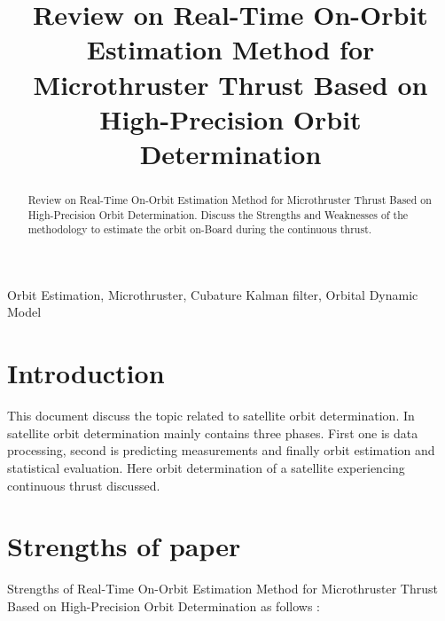 \documentclass[conference]{IEEEtran}
\begin{document}
\title{Review on Real-Time On-Orbit Estimation Method for Microthruster Thrust
	Based on High-Precision Orbit Determination\\

}

\author{
}

\maketitle

\begin{abstract}
Review on Real-Time On-Orbit Estimation Method for Microthruster Thrust Based on High-Precision Orbit Determination. Discuss the Strengths and Weaknesses of the methodology to estimate the orbit on-Board during the continuous thrust.  
\end{abstract}

\begin{IEEEkeywords}
Orbit Estimation, Microthruster, Cubature Kalman ﬁlter, Orbital Dynamic Model 
\end{IEEEkeywords}

\section{Introduction}
This document discuss the topic related to satellite orbit determination. In satellite orbit determination mainly contains three phases. First one is data processing, second is predicting measurements and finally orbit estimation and statistical evaluation. Here orbit determination of a satellite experiencing continuous thrust discussed.    

\section{Strengths of paper \cite{yang2021real}}

Strengths of Real-Time On-Orbit Estimation Method for Microthruster Thrust Based on High-Precision Orbit Determination as follows :
\end{document}
